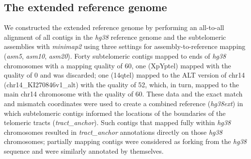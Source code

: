 \documentclass{article}
\begin{document}
\subsection*{The extended reference genome}
    We constructed the extended reference genome by performing an all-to-all alignment
        of all contigs in the \textit{hg38} reference genome \cite{grch38,hg38}
        and the subtelomeric assemblies \cite{riethman2014}
        with \textit{minimap2} \cite{minimap} using three settings
            for assembly-to-reference mapping (\textit{asm5}, \textit{asm10}, \textit{asm20}).
    Forty subtelomeric contigs mapped to ends of \textit{hg38} chromosomes with a mapping quality of 60,
        one (XpYptel) mapped with the quality of 0 and was discarded;
        one (14qtel) mapped to the ALT version of chr14 (chr14\_KI270846v1\_alt) with the quality of 52,
            which, in turn, mapped to the main chr14 chromosome with the quality of 60.
    These data and the exact match and mismatch coordinates were used to create a combined reference (\textit{hg38ext})
        in which subtelomeric contigs informed the locations of the boundaries of the telomeric tracts (\textit{tract\_anchor}).
    Such contigs that mapped fully within \textit{hg38} chromosomes resulted in \textit{tract\_anchor} annotations
            directly on those \textit{hg38} chromosomes;
        partially mapping contigs were considered as forking from the \textit{hg38} sequence and were similarly annotated by themselves.
\end{document}
